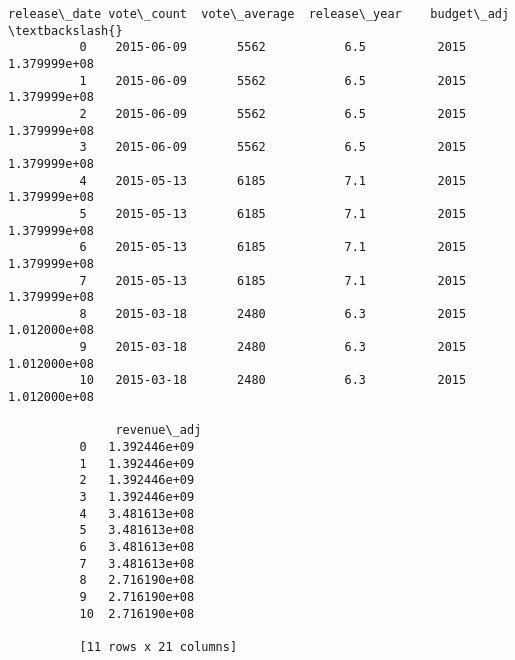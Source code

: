 \documentclass[11pt]{article}
\begin{document}
\begin{Verbatim}[commandchars=\\\{\}]
             release\_date vote\_count  vote\_average  release\_year    budget\_adj  \textbackslash{}
          0    2015-06-09       5562           6.5          2015  1.379999e+08   
          1    2015-06-09       5562           6.5          2015  1.379999e+08   
          2    2015-06-09       5562           6.5          2015  1.379999e+08   
          3    2015-06-09       5562           6.5          2015  1.379999e+08   
          4    2015-05-13       6185           7.1          2015  1.379999e+08   
          5    2015-05-13       6185           7.1          2015  1.379999e+08   
          6    2015-05-13       6185           7.1          2015  1.379999e+08   
          7    2015-05-13       6185           7.1          2015  1.379999e+08   
          8    2015-03-18       2480           6.3          2015  1.012000e+08   
          9    2015-03-18       2480           6.3          2015  1.012000e+08   
          10   2015-03-18       2480           6.3          2015  1.012000e+08   
          
               revenue\_adj  
          0   1.392446e+09  
          1   1.392446e+09  
          2   1.392446e+09  
          3   1.392446e+09  
          4   3.481613e+08  
          5   3.481613e+08  
          6   3.481613e+08  
          7   3.481613e+08  
          8   2.716190e+08  
          9   2.716190e+08  
          10  2.716190e+08  
          
          [11 rows x 21 columns]
\end{Verbatim}
            
\end{document}
